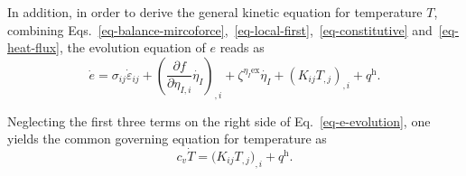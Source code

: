 \documentclass[reprint,3p,sort&compress,times,onecolumn]{elsarticle}
\begin{document}


In addition, in order to derive the general kinetic equation for temperature $T$, combining
Eqs.~\ref{eq-balance-mircoforce},~\ref{eq-local-first},~\ref{eq-constitutive} and~\ref{eq-heat-flux}, the evolution equation of $e$ reads as
\begin{equation}
\dot{e}= \sigma_{ij}\dot{\varepsilon}_{ij}+ \left(\frac{\partial f}{\partial \eta_{I,i}}\dot{\eta_I}\right)_{,i}+\zeta^{\eta_I \text{ex}}\dot{\eta_I}+ \left(K_{ij}T_{,j}\right)_{,i} +q^{\text{h}}. \label{eq-e-evolution}
\end{equation}

Neglecting the first three terms on the right side of Eq.~\ref{eq-e-evolution}, one yields the common governing equation for temperature as
\begin{equation}
c_v\dot{T}= \big(K_{ij}T_{,j}\big)_{,i} +q^{\text{h}}.
\end{equation}
\end{document}
